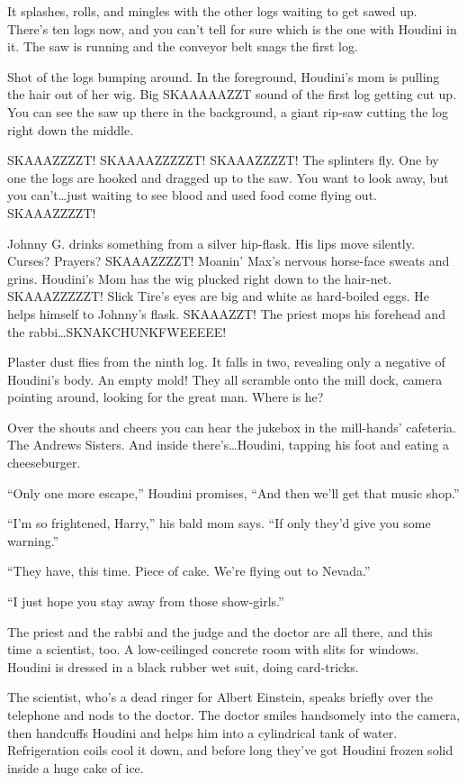 It splashes, rolls, and mingles with the other logs waiting to get sawed up. There's ten logs now, and you can't tell for sure which is the one with Houdini in it. The saw is running and the conveyor belt snags the first log.

Shot of the logs bumping around. In the foreground, Houdini's mom is pulling the hair out of her wig. Big SKAAAAAZZT sound of the first log getting cut up. You can see the saw up there in the background, a giant rip-saw cutting the log right down the middle.

SKAAAZZZZT! SKAAAAZZZZZT! SKAAAZZZZT! The splinters fly. One by one the logs are hooked and dragged up to the saw. You want to look away, but you can't\ldots just waiting to see blood and used food come flying out. SKAAAZZZZT!

Johnny G. drinks something from a silver hip-flask. His lips move silently. Curses? Prayers? SKAAAZZZZT! Moanin' Max's nervous horse-face sweats and grins. Houdini's Mom has the wig plucked right down to the hair-net. SKAAAZZZZZT! Slick Tire's eyes are big and white as hard-boiled eggs. He helps himself to Johnny's flask. SKAAAZZT! The priest mops his forehead and the rabbi\ldots SKNAKCHUNKFWEEEEE!

Plaster dust flies from the ninth log. It falls in two, revealing only a negative of Houdini's body. An empty mold! They all scramble onto the mill dock, camera pointing around, looking for the great man. Where is he?

Over the shouts and cheers you can hear the jukebox in the mill-hands' cafeteria. The Andrews Sisters. And inside there's\ldots Houdini, tapping his foot and eating a cheeseburger.

``Only one more escape,'' Houdini promises, ``And then we'll get that music shop.''

``I'm so frightened, Harry,'' his bald mom says. ``If only they'd give you some warning.''

``They have, this time. Piece of cake. We're flying out to Nevada.''

``I just hope you stay away from those show-girls.''

The priest and the rabbi and the judge and the doctor are all there, and this time a scientist, too. A low-ceilinged concrete room with slits for windows. Houdini is dressed in a black rubber wet suit, doing card-tricks.

The scientist, who's a dead ringer for Albert Einstein, speaks briefly over the telephone and nods to the doctor. The doctor smiles handsomely into the camera, then handcuffs Houdini and helps him into a cylindrical tank of water. Refrigeration coils cool it down, and before long they've got Houdini frozen solid inside a huge cake of ice.


